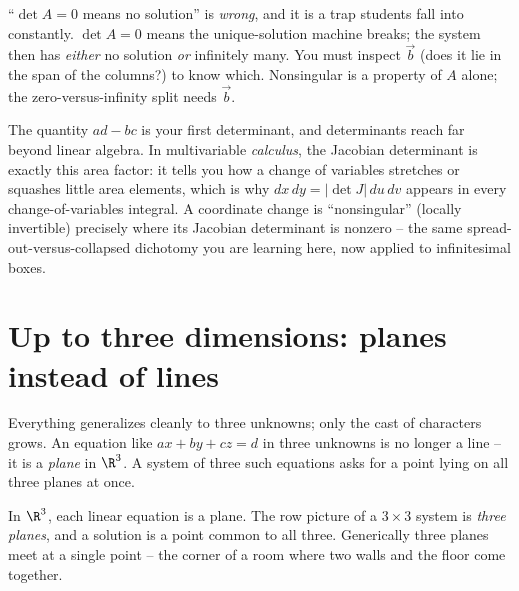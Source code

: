 \begin{trapbox}
``$\det A=0$ means no solution'' is \emph{wrong}, and it is a trap students
fall into constantly. $\det A = 0$ means the unique-solution machine breaks;
the system then has \emph{either} no solution \emph{or} infinitely many. You
must inspect $\vec b$ (does it lie in the span of the columns?) to know
which. Nonsingular is a property of $A$ alone; the zero-versus-infinity split
needs $\vec b$.
\end{trapbox}

\begin{connectionbox}
The quantity $ad-bc$ is your first determinant, and determinants reach far
beyond linear algebra. In multivariable \emph{calculus}, the Jacobian
determinant is exactly this area factor: it tells you how a change of
variables stretches or squashes little area elements, which is why
$dx\,dy = \lvert\det J\rvert\,du\,dv$ appears in every change-of-variables
integral. A coordinate change is ``nonsingular'' (locally invertible)
precisely where its Jacobian determinant is nonzero -- the same
spread-out-versus-collapsed dichotomy you are learning here, now applied to
infinitesimal boxes.
\end{connectionbox}

\section{Up to three dimensions: planes instead of lines}

Everything generalizes cleanly to three unknowns; only the cast of
characters grows. An equation like $a x + b y + c z = d$ in three unknowns is
no longer a line -- it is a \emph{plane} in $\R^3$. A system of three such
equations asks for a point lying on all three planes at once.

\begin{intuitionbox}
In $\R^3$, each linear equation is a plane. The row picture of a
$3\times3$ system is \emph{three planes}, and a solution is a point common to
all three. Generically three planes meet at a single point -- the corner of
a room where two walls and the floor come together.
\end{intuitionbox}

